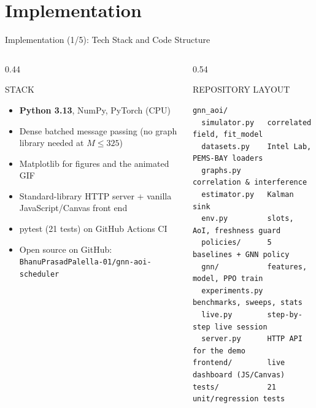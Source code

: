 \documentclass[aspectratio=169,10pt,xcolor=table]{beamer}
\newcommand{\sect}[1]{\par{\color{muted}\scriptsize\MakeUppercase{#1}}\par\vspace{0.2em}}
\begin{document}
\section{Implementation}

\begin{frame}[fragile]{Implementation (1/5): Tech Stack and Code Structure}
  \begin{columns}[T]
    \begin{column}{0.44\textwidth}
      \sect{Stack}
      \begin{itemize}\small\setlength\itemsep{0.35em}
        \item \textbf{Python 3.13}, NumPy, PyTorch (CPU)
        \item Dense batched message passing (no graph library needed at $M\le 325$)
        \item Matplotlib for figures and the animated GIF
        \item Standard-library HTTP server + vanilla JavaScript/Canvas front end
        \item pytest (21 tests) on GitHub Actions CI
        \item Open source on GitHub:\\ {\scriptsize\texttt{BhanuPrasadPalella-01/gnn-aoi-scheduler}}
      \end{itemize}
    \end{column}
    \begin{column}{0.54\textwidth}
      \sect{Repository layout}
      \scriptsize
\begin{verbatim}
gnn_aoi/
  simulator.py   correlated field, fit_model
  datasets.py    Intel Lab, PEMS-BAY loaders
  graphs.py      correlation & interference
  estimator.py   Kalman sink
  env.py         slots, AoI, freshness guard
  policies/      5 baselines + GNN policy
  gnn/           features, model, PPO train
  experiments.py benchmarks, sweeps, stats
  live.py        step-by-step live session
  server.py      HTTP API for the demo
frontend/        live dashboard (JS/Canvas)
tests/           21 unit/regression tests
\end{verbatim}
    \end{column}
  \end{columns}
\end{frame}
\end{document}
